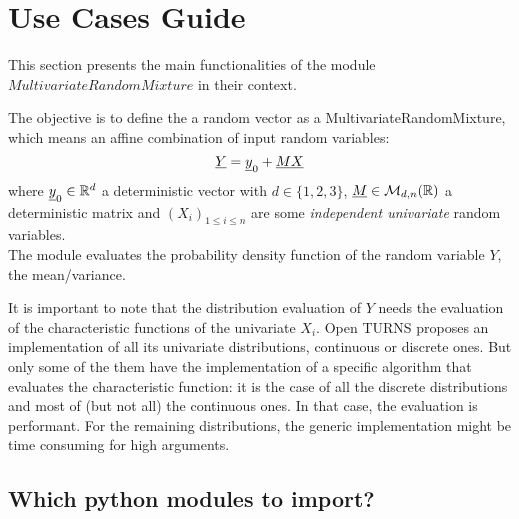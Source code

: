 



\section{Use Cases Guide}

This section presents the main functionalities of the module $MultivariateRandomMixture$ in their context.


The objective is to define the a random vector as a MultivariateRandomMixture, which means an affine combination of input random variables:
$$
\displaystyle   {\underline{Y}}={\underline{y}}_0+{\underline{M}}{\underline{X}}
$$
where ${\underline{y}}_0\in\mathbb{R}^d$ a deterministic vector with  $d\in\{1,2,3\}$, ${\underline{M}}\in\mathcal{M}_{d,n}(\mathbb{R})$ a deterministic matrix
and $(X_i)_{ 1 \leq i \leq n}$ are some  \emph{independent univariate} random variables.\\


The module evaluates the probability density function of the random variable $Y$, the mean\slash variance.

It is important to note that the distribution evaluation of $Y$ needs the evaluation of the characteristic functions of the univariate $X_i$. 
Open TURNS proposes an implementation of all its univariate distributions, continuous or discrete ones. 
But only some of the them have the implementation of a specific algorithm that evaluates the characteristic function: 
it is the case of all the discrete distributions and most of (but not all) the continuous ones. 
In that case, the evaluation is performant. 
For the remaining distributions, the generic implementation might be time consuming for high arguments. \\


\subsection{Which python modules to import?}

